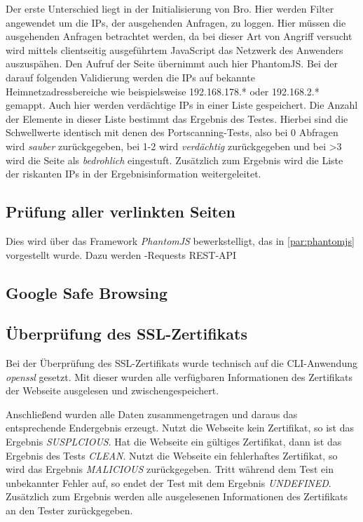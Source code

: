 Der erste Unterschied liegt in der Initialisierung von Bro. Hier werden Filter angewendet um die IPs, der ausgehenden Anfragen, zu loggen. Hier müssen die ausgehenden Anfragen betrachtet werden, da bei dieser Art von Angriff versucht wird mittels clientseitig ausgeführtem JavaScript das Netzwerk des Anwenders auszuspähen. Den Aufruf der Seite übernimmt auch hier PhantomJS. Bei der darauf folgenden Validierung werden die IPs auf bekannte Heimnetzadressbereiche wie beispielsweise 192.168.178.* oder 192.168.2.* gemappt. Auch hier werden verdächtige IPs in einer Liste gespeichert. Die Anzahl der Elemente in dieser Liste bestimmt das Ergebnis des Testes. Hierbei sind die Schwellwerte identisch mit denen des Portscanning-Tests, also bei 0 Abfragen wird \textit{sauber} zurückgegeben, bei 1-2 wird \textit{verdächtig} zurückgegeben und bei >3 wird die Seite als \textit{bedrohlich} eingestuft. Zusätzlich zum Ergebnis wird die Liste der riskanten IPs in der Ergebnisinformation weitergeleitet.

\subsection{Prüfung aller verlinkten Seiten}

Dies wird über das Framework \textit{PhantomJS} bewerkstelligt, das in \autoref{par:phantomjs} vorgestellt wurde.
Dazu werden -Requests \ac{REST}-\ac{API}

\subsection{Google Safe Browsing}


\subsection{Überprüfung des SSL-Zertifikats}

Bei der Überprüfung des SSL-Zertifikats wurde technisch auf die \ac{CLI}-Anwendung \textit{openssl} gesetzt. Mit dieser wurden alle verfügbaren Informationen des Zertifikats der Webseite ausgelesen und zwischengespeichert.

Anschließend wurden alle Daten zusammengetragen und daraus das entsprechende Endergebnis erzeugt. Nutzt die Webseite kein Zertifikat, so ist das Ergebnis \textit{SUSPLCIOUS}. Hat die Webseite ein gültiges Zertifikat, dann ist das Ergebnis des Tests \textit{CLEAN}. Nutzt die Webseite ein fehlerhaftes Zertifikat, so wird das Ergebnis \textit{MALICIOUS} zurückgegeben. Tritt während dem Test ein unbekannter Fehler auf, so endet der Test mit dem Ergebnis \textit{UNDEFINED}. Zusätzlich zum Ergebnis werden alle ausgelesenen Informationen des Zertifikats an den Tester zurückgegeben.

